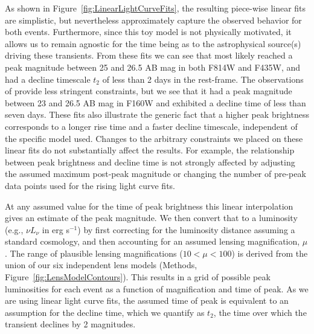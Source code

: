 As shown in Figure~\ref{fig:LinearLightCurveFits}, the resulting
piece-wise linear fits are simplistic, but nevertheless approximately
capture the observed behavior for both events.  Furthermore, since
this toy model is not physically motivated, it allows us to remain
agnostic for the time being as to the astrophysical source(s) driving
these transients.  From these fits we can see that \spockone most
likely reached a peak magnitude between 25 and 26.5 AB mag in both
F814W and F435W, and had a decline timescale $t_2$ of less than 2 days
in the rest-frame. The observations of \spocktwo provide less
stringent constraints, but we see that it had a peak magnitude between
23 and 26.5 AB mag in F160W and exhibited a decline time of less than
seven days.  These fits also illustrate the generic fact that a higher
peak brightness corresponds to a longer rise time and a faster decline
timescale, independent of the specific model used.  Changes to the
arbitrary constraints we placed on these linear fits do not
substantially affect the results.  For example, the relationship
between peak brightness and decline time is not strongly affected by
adjusting the assumed maximum post-peak magnitude or changing the
number of pre-peak data points used for the rising light curve fits.

At any assumed value for the time of peak brightness this linear
interpolation gives an estimate of the peak magnitude. We then convert
that to a luminosity (e.g., $\nu L_\nu$ in erg s$^{-1}$) by first
correcting for the luminosity distance assuming a standard \LCDM
cosmology, and then accounting for an assumed lensing magnification,
$\mu$.  The range of plausible lensing magnifications ($10<\mu<100$)
is derived from the union of our six independent lens models (Methods,
Figure~\ref{fig:LensModelContours}).  This results in a grid of
possible peak luminosities for each event as a function of
magnification and time of peak.  As we are using linear light curve
fits, the assumed time of peak is equivalent to an assumption for the
decline time, which we quantify as $t_2$, the time over which the
transient declines by 2 magnitudes.



